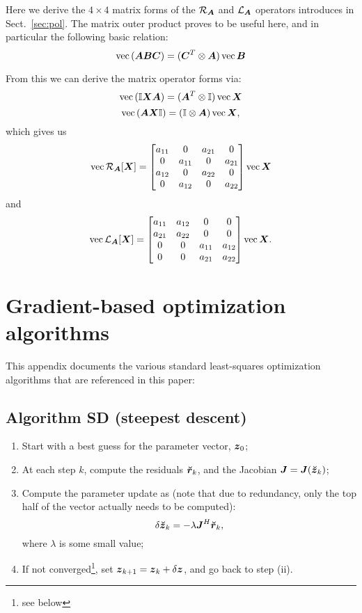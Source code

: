 \documentclass[useAMS,usenatbib]{mn2e}
\makeatletter
\newcommand{\II}{\mathbb{I}}
\newcommand{\zz}{\bmath{z}}
\newcommand{\mat}[1]{{\bmath{#1}}}
\newcommand{\JJ}{\mat{J}} %
\newcommand{\Matrix}[2]{\left [ \begin{array}{@{}#1@{}}#2\end{array} \right ]}
\newcommand{\AUG}[1]{\bmath{\breve{#1}}}
\newcommand{\Zz}{\AUG{z}}
\newcommand{\Rr}{\AUG{r}}
\newcommand{\Rop}[1]{\mathcal{R}_{{#1}}}
\newcommand{\Lop}[1]{\mathcal{L}_{{#1}}}
\numberwithin{equation}{section}
\makeatother
\begin{document}
Here we derive the $4\times4$ matrix forms of the $\Rop{\mat{A}}$ and $\Lop{\mat{A}}$ operators introduces in 
Sect.~\ref{sec:pol}. The matrix outer product proves to be useful here, and in particular the  following 
basic relation:
\begin{equation}
\VEC(\mat{A}\mat{B}\mat{C}) = (\mat{C}^T \otimes \mat{A})\,\VEC{\mat{B}}
\end{equation}

From this we can derive the matrix operator forms via:
\begin{equation}
\VEC(\II\mat{X}\mat{A}) = (\mat{A}^T \otimes \II)\,\VEC{\mat{X}}
\end{equation}
\begin{equation}
\VEC(\mat{A}\mat{X}\II) = (\II \otimes \mat{A})\,\VEC{\mat{X}},
\end{equation}
which gives us
\begin{equation}
\label{eq:RA4x4}
\VEC{\Rop{\mat{A}}[\mat{X}]} = 
\Matrix{cccc}{a_{11}&0&a_{21}&0 \\ 0&a_{11}&0&a_{21} \\ a_{12}&0&a_{22}&0  \\ 0&a_{12}&0&a_{22} }
\VEC{\mat{X}}
\end{equation}
and
\begin{equation}
\label{eq:LA4x4}
\VEC{\Lop{\mat{A}}[\mat{X}]} = 
\Matrix{cccc}{a_{11}&a_{12}&0&0 \\ a_{21}&a_{22}&0&0 \\ 0&0&a_{11}&a_{12} \\ 0&0&a_{21}&a_{22} }
\VEC{\mat{X}}.
\end{equation}


\section{Gradient-based optimization algorithms}
\label{sec:algs}

This appendix documents the various standard least-squares optimization algorithms 
that are referenced in this paper:

\subsection{Algorithm SD (steepest descent)}

\begin{enumerate}
\item Start with a best guess for the parameter vector, $\bmath{z}_0$;
\item At each step $k$, compute the residuals $\Rr_k$, and the Jacobian
$\JJ=\JJ(\Zz_k)$;
\item Compute the parameter update as (note that due to redundancy, only the top half of the vector actually needs
to be computed):
\begin{equation}
\delta\Zz_k = - \lambda \JJ^H \Rr_k,
\end{equation}
where $\lambda$ is some small value;
\item If not converged\footnote{see below}, set $\bmath{z}_{k+1}=\bmath{z}_k+\delta\zz$, and go back to step (ii).
\end{enumerate}
\end{document}
